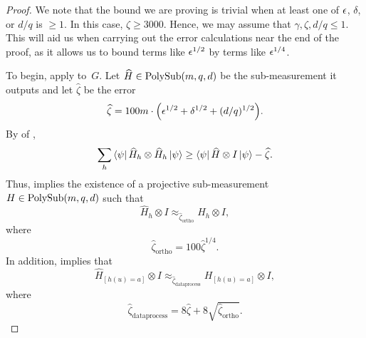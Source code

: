 \begin{proof}
We note that the bound we are proving is trivial when at least one of $\epsilon$, $\delta$, or $d/q$ is $\geq 1$.
In this case, $\zeta \geq 3000$.
Hence, we may assume that $\gamma, \zeta, d/q \leq 1$.
This will aid us when carrying out the error calculations near the end of the proof,
as it allows us to bound terms like $\epsilon^{1/2}$ by terms like $\epsilon^{1/4}$.

To begin,  apply  to~$G$.
Let $\widehat{H} \in \mathrm{PolySub}(m, q, d)$ be the sub-measurement it outputs
and let $\widehat{\zeta}$ be the error
\begin{equation*}
\widehat{\zeta} = 100m \cdot \Big(\epsilon^{1/2} + \delta^{1/2} + (d/q)^{1/2}\Big).
\end{equation*}
By  of ,
\begin{equation*}
\sum_{h} \bra{\psi} \widehat{H}_h \otimes \widehat{H}_h \ket{\psi}
	\geq \bra{\psi} \widehat{H} \otimes I \ket{\psi} - \widehat{\zeta}.
\end{equation*}
Thus,  implies the existence of a projective sub-measurement
$H \in \mathrm{PolySub}(m, q, d)$ such that
\begin{equation}\label{eq:approx-between-H-with-and-without-hat}
\widehat{H}_h \otimes I \approx_{\widehat{\zeta}_{\mathrm{ortho}}} H_{h} \otimes I,
\end{equation}
where
\begin{equation*}
\widehat{\zeta}_{\mathrm{ortho}} = 100 \widehat{\zeta}^{1/4}.
\end{equation*}
In addition,  implies that
\begin{equation}\label{eq:approx-data-processed}
\widehat{H}_{[h(u)=a]} \otimes I \approx_{\widehat{\zeta}_{\mathrm{dataprocess}}} H_{[h(u)=a]} \otimes I,
\end{equation}
where
\begin{equation*}
\widehat{\zeta}_{\mathrm{dataprocess}} = 8 \widehat{\zeta} + 8 \sqrt{\widehat{\zeta}_{\mathrm{ortho}}}.
\end{equation*}


\end{proof}
